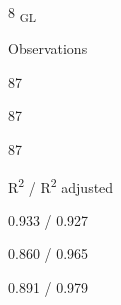 \documentclass[
  letterpaper,
  DIV=11,
  numbers=noendperiod]{scrartcl}
\begin{document}
\begin{table}
\begin{minipage}[t]{\linewidth}
{\centering 

8 \textsubscript{GL}

}

\end{minipage}%
\newline
\begin{minipage}[t]{\linewidth}

{\centering 

Observations

}

\end{minipage}%
\newline
\begin{minipage}[t]{\linewidth}

{\centering 

87

}

\end{minipage}%
\newline
\begin{minipage}[t]{\linewidth}

{\centering 

87

}

\end{minipage}%
\newline
\begin{minipage}[t]{\linewidth}

{\centering 

87

}

\end{minipage}%
\newline
\begin{minipage}[t]{\linewidth}

{\centering 

R\textsuperscript{2} / R\textsuperscript{2} adjusted

}

\end{minipage}%
\newline
\begin{minipage}[t]{\linewidth}

{\centering 

0.933 / 0.927

}

\end{minipage}%
\newline
\begin{minipage}[t]{\linewidth}

{\centering 

0.860 / 0.965

}

\end{minipage}%
\newline
\begin{minipage}[t]{\linewidth}

{\centering 

0.891 / 0.979

}

\end{minipage}%

\end{table}
\end{document}
